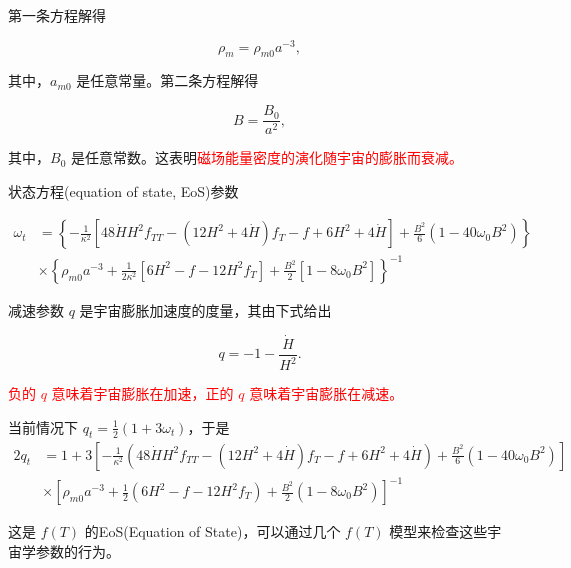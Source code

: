 \documentclass[9pt, dvipsnames]{beamer} %
\begin{document}
\begin{frame}
    第一条方程解得

    $$
    \rho_m = \rho_{m0} a^{-3},
    $$

    其中，$a_{m0}$ 是任意常量。第二条方程解得

    $$
    B=\frac{B_0}{a^2},
    $$

    其中，$B_0$ 是任意常数。这表明\textcolor{red}{磁场能量密度的演化随宇宙的膨胀而衰减。}

    状态方程(equation of state, EoS)参数

    $$
    \begin{aligned}
        \omega_t
        &=\left\{-\frac{1 }{\kappa^2 } \left[48\dot{H}H^2 f_{TT} - \left(12 H^2 + 4\dot{H} \right) f_T - f + 6 H^2 + 4\dot{H} \right] + \frac{B^2 }{6 } \left(1-40\omega_0 B^2 \right) \right\} \\
        &\times \left\{\rho_{m0} a^{-3} + \frac{1 }{2\kappa^2 } \left[6 H^2 - f-12 H^2 f_T \right] + \frac{B^2 }{2 } \left[1-8\omega_0 B^2 \right] \right\}^{-1}
        \end{aligned}
    $$

    减速参数 $q$ 是宇宙膨胀加速度的度量，其由下式给出

    $$
    q = -1 - \frac{\dot{H} }{H^2 } .
    $$

    \textcolor{red}{负的 $q$ 意味着宇宙膨胀在加速，正的 $q$ 意味着宇宙膨胀在减速。}

\end{frame}

\begin{frame}
    当前情况下 $q_t=\frac{1}{2}(1+3\omega_t)$，于是
    $$
    \begin{aligned}
        2q_t
        &=1 + 3\left[-\frac{1 }{\kappa^2 } \left(48\dot{H} H^2 f_{TT} - \left(12 H^2 + 4\dot{H} \right) f_T - f + 6H^2 + 4\dot{H} \right) + \frac{B^2 }{6 } \left(1-40\omega_0 B^2 \right) \right] \\
        &\times \left[\rho_{m0}a^{-3} + \frac{1 }{2 } \left(6H^2-f-12H^2 f_T \right) + \frac{B^2 }{2 } \left(1-8\omega_0 B^2 \right) \right]^{-1}
    \end{aligned}
    $$

    这是 $f(T)$ 的EoS(Equation of State)，可以通过几个 $f(T)$ 模型来检查这些宇宙学参数的行为。
\end{frame}
\end{document}
